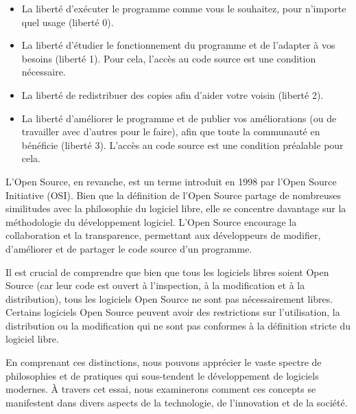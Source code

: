 \begin{itemize}
\item La liberté d'exécuter le programme comme vous le souhaitez, pour n'importe quel usage (liberté 0).
\item La liberté d'étudier le fonctionnement du programme et de l'adapter à vos besoins (liberté 1). Pour cela, l'accès au code source est une condition nécessaire.
\item La liberté de redistribuer des copies afin d'aider votre voisin (liberté 2).
\item La liberté d'améliorer le programme et de publier vos améliorations (ou de travailler avec d'autres pour le faire), afin que toute la communauté en bénéficie (liberté 3). L'accès au code source est une condition préalable pour cela.
\end{itemize}

L'Open Source, en revanche, est un terme introduit en 1998 par l'Open Source Initiative (OSI)\cite{FSF,OSI}. Bien que la définition de l'Open Source partage de nombreuses similitudes avec la philosophie du logiciel libre, elle se concentre davantage sur la méthodologie du développement logiciel. L'Open Source encourage la collaboration et la transparence, permettant aux développeurs de modifier, d'améliorer et de partager le code source d'un programme.

Il est crucial de comprendre que bien que tous les logiciels libres soient Open Source (car leur code est ouvert à l'inspection, à la modification et à la distribution), tous les logiciels Open Source ne sont pas nécessairement libres. Certains logiciels Open Source peuvent avoir des restrictions sur l'utilisation, la distribution ou la modification qui ne sont pas conformes à la définition stricte du logiciel libre.

En comprenant ces distinctions, nous pouvons apprécier le vaste spectre de philosophies et de pratiques qui sous-tendent le développement de logiciels modernes. À travers cet essai, nous examinerons comment ces concepts se manifestent dans divers aspects de la technologie, de l'innovation et de la société.

